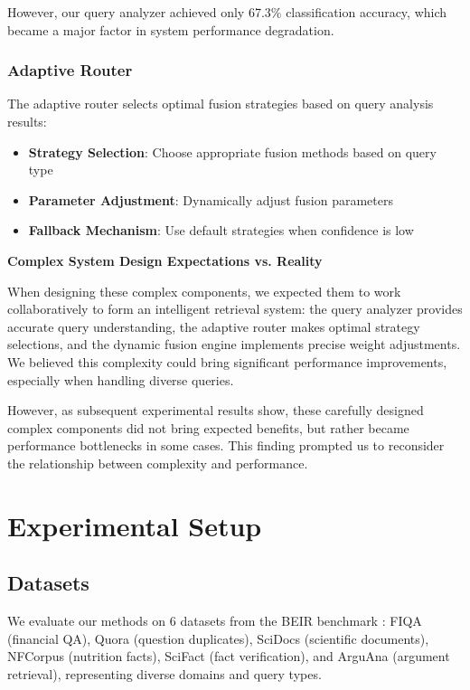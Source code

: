 \documentclass[letterpaper]{article} %
\begin{document}
However, our query analyzer achieved only 67.3\% classification accuracy, which became a major factor in system performance degradation.

\subsubsection{Adaptive Router}

The adaptive router selects optimal fusion strategies based on query analysis results:

\begin{itemize}
\item \textbf{Strategy Selection}: Choose appropriate fusion methods based on query type
\item \textbf{Parameter Adjustment}: Dynamically adjust fusion parameters
\item \textbf{Fallback Mechanism}: Use default strategies when confidence is low
\end{itemize}

\textbf{Complex System Design Expectations vs. Reality}

When designing these complex components, we expected them to work collaboratively to form an intelligent retrieval system: the query analyzer provides accurate query understanding, the adaptive router makes optimal strategy selections, and the dynamic fusion engine implements precise weight adjustments. We believed this complexity could bring significant performance improvements, especially when handling diverse queries.

However, as subsequent experimental results show, these carefully designed complex components did not bring expected benefits, but rather became performance bottlenecks in some cases. This finding prompted us to reconsider the relationship between complexity and performance.

\section{Experimental Setup}

\subsection{Datasets}

We evaluate our methods on 6 datasets from the BEIR benchmark \cite{thakur2021beir}: FIQA (financial QA), Quora (question duplicates), SciDocs (scientific documents), NFCorpus (nutrition facts), SciFact (fact verification), and ArguAna (argument retrieval), representing diverse domains and query types.
\end{document}
